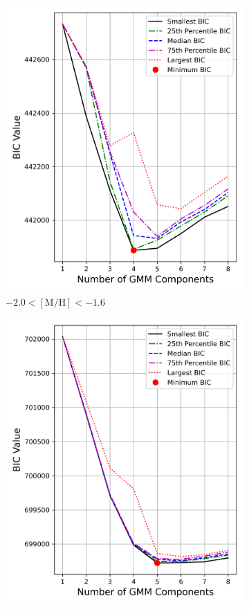 \documentclass[a4paper,12pt]{article}
\begin{document}
\begin{figure}[h]
\begin{subfigure}[t]{0.23\textwidth}
        \includegraphics[width=\linewidth]{../figures/bic_imp.png}
        \caption{$-2.0 < \mathrm{[M/H]} < -1.6$}
    \end{subfigure}
    \hfill
    \begin{subfigure}[t]{0.23\textwidth}
        \centering
        \includegraphics[width=\linewidth]{../figures/bic_mp1.png}

\end{subfigure}
\end{figure}
\end{document}
